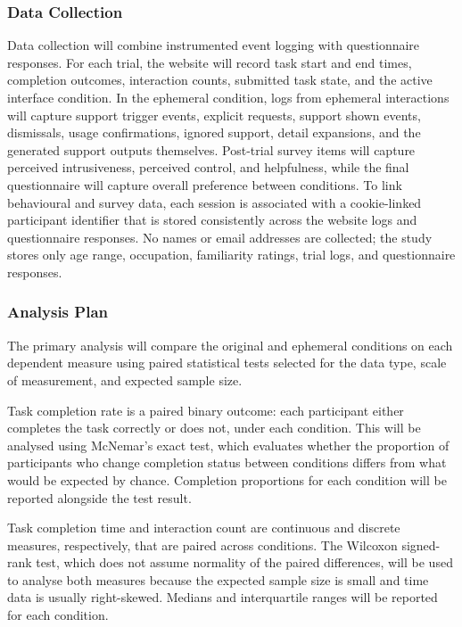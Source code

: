 \subsubsection{Data Collection}
Data collection will combine instrumented event logging with questionnaire responses. For each trial, the website will record task start and end times, completion outcomes, interaction counts, submitted task state, and the active interface condition. In the ephemeral condition, logs from ephemeral interactions will capture support trigger events, explicit requests, support shown events, dismissals, usage confirmations, ignored support, detail expansions, and the generated support outputs themselves. Post-trial survey items will capture perceived intrusiveness, perceived control, and helpfulness, while the final questionnaire will capture overall preference between conditions. To link behavioural and survey data, each session is associated with a cookie-linked participant identifier that is stored consistently across the website logs and questionnaire responses. No names or email addresses are collected; the study stores only age range, occupation, familiarity ratings, trial logs, and questionnaire responses.

\subsubsection{Analysis Plan}
The primary analysis will compare the original and ephemeral conditions on each dependent measure using paired statistical tests selected for the data type, scale of measurement, and expected sample size.

Task completion rate is a paired binary outcome: each participant either completes the task correctly or does not, under each condition. This will be analysed using McNemar's exact test, which evaluates whether the proportion of participants who change completion status between conditions differs from what would be expected by chance. Completion proportions for each condition will be reported alongside the test result.

Task completion time and interaction count are continuous and discrete measures, respectively, that are paired across conditions. The Wilcoxon signed-rank test, which does not assume normality of the paired differences, will be used to analyse both measures because the expected sample size is small and time data is usually right-skewed. Medians and interquartile ranges will be reported for each condition.

